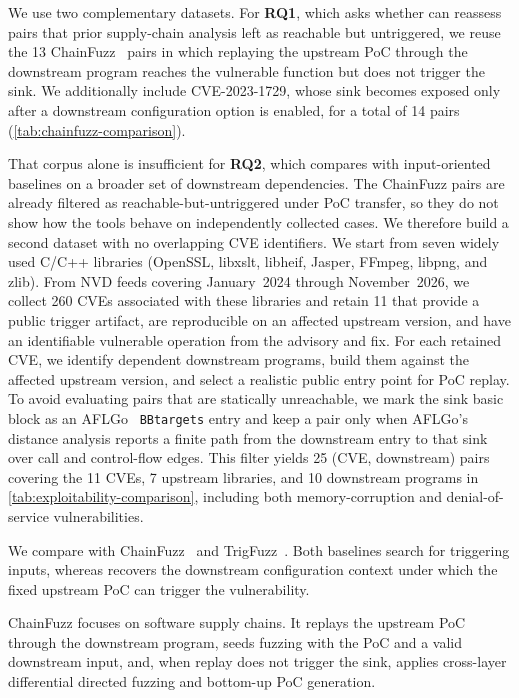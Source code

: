 We use two complementary datasets.
For \textbf{RQ1}, which asks whether \sys can reassess pairs that prior supply-chain analysis left as reachable but untriggered, we reuse the 13 ChainFuzz~\cite{deng2025chainfuzz} pairs in which replaying the upstream PoC through the downstream program reaches the vulnerable function but does not trigger the sink.
We additionally include CVE-2023-1729, whose sink becomes exposed only after a downstream configuration option is enabled, for a total of 14 pairs (\autoref{tab:chainfuzz-comparison}).

That corpus alone is insufficient for \textbf{RQ2}, which compares \sys with input-oriented baselines on a broader set of downstream dependencies.
The ChainFuzz pairs are already filtered as reachable-but-untriggered under PoC transfer, so they do not show how the tools behave on independently collected cases.
We therefore build a second dataset with no overlapping CVE identifiers.
We start from seven widely used C/C++ libraries (OpenSSL, libxslt, libheif, Jasper, FFmpeg, libpng, and zlib).
From NVD feeds covering January~2024 through November~2026, we collect 260 CVEs associated with these libraries and retain 11 that provide a public trigger artifact, are reproducible on an affected upstream version, and have an identifiable vulnerable operation from the advisory and fix.
For each retained CVE, we identify dependent downstream programs, build them against the affected upstream version, and select a realistic public entry point for PoC replay.
To avoid evaluating pairs that are statically unreachable, we mark the sink basic block as an AFLGo~\cite{bohme2017aflgo} \texttt{BBtargets} entry and keep a pair only when AFLGo's distance analysis reports a finite path from the downstream entry to that sink over call and control-flow edges.
This filter yields 25 (CVE, downstream) pairs covering the 11 CVEs, 7 upstream libraries, and 10 downstream programs in \autoref{tab:exploitability-comparison}, including both memory-corruption and denial-of-service vulnerabilities.

We compare \sys with ChainFuzz~\cite{deng2025chainfuzz} and TrigFuzz~\cite{chen2026trigfuzz}.
Both baselines search for triggering inputs, whereas \sys recovers the downstream configuration context under which the fixed upstream PoC can trigger the vulnerability.

ChainFuzz focuses on software supply chains.
It replays the upstream PoC through the downstream program, seeds fuzzing with the PoC and a valid downstream input, and, when replay does not trigger the sink, applies cross-layer differential directed fuzzing and bottom-up PoC generation.

